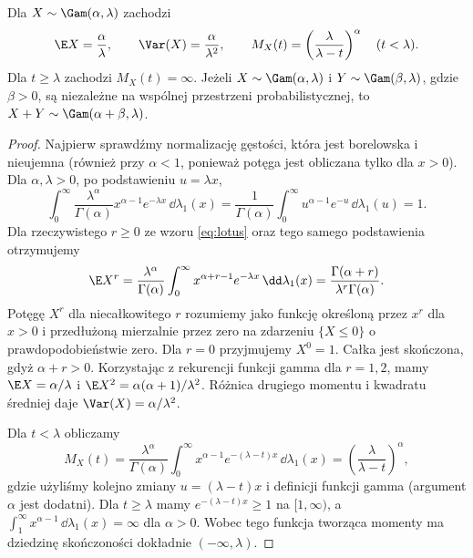 \begin{stwierdzenie}
Dla $X\sim\Gam(\alpha,\lambda)$ zachodzi
\[
\E X=\frac\alpha\lambda,\qquad
\Var(X)=\frac\alpha{\lambda^2},\qquad
M_X(t)=\left(\frac\lambda{\lambda-t}\right)^\alpha\quad(t<\lambda).
\]
Dla $t\geq\lambda$ zachodzi $M_X(t)=\infty$.
Jeżeli $X\sim\Gam(\alpha,\lambda)$ i
$Y\sim\Gam(\beta,\lambda)$, gdzie $\beta>0$, są niezależne
na wspólnej przestrzeni probabilistycznej, to
$X+Y\sim\Gam(\alpha+\beta,\lambda)$.
\end{stwierdzenie}
\begin{proof}
Najpierw sprawdźmy normalizację gęstości, która
jest borelowska i nieujemna (również przy $\alpha<1$,
ponieważ potęga jest obliczana tylko dla $x>0$).
Dla $\alpha,\lambda>0$, po podstawieniu $u=\lambda x$,
\[
\int_0^\infty\frac{\lambda^\alpha}{\Gamma(\alpha)}
 x^{\alpha-1}e^{-\lambda x}\,\dd\lambda_1(x)
=\frac1{\Gamma(\alpha)}\int_0^\infty
u^{\alpha-1}e^{-u}\,\dd\lambda_1(u)=1.
\]
Dla rzeczywistego $r\geq0$ ze wzoru \eqref{eq:lotus}
oraz tego samego podstawienia otrzymujemy
\[
\E X^r
=\frac{\lambda^\alpha}{\Gamma(\alpha)}
\int_0^\infty x^{\alpha+r-1}e^{-\lambda x}\,\dd\lambda_1(x)
=\frac{\Gamma(\alpha+r)}{\lambda^r\Gamma(\alpha)}.
\]
Potęgę $X^r$ dla niecałkowitego $r$ rozumiemy jako
funkcję określoną przez $x^r$ dla $x>0$ i przedłużoną
mierzalnie przez zero na zdarzeniu $\{X\leq0\}$
o prawdopodobieństwie zero. Dla $r=0$ przyjmujemy $X^0=1$.
Całka jest skończona, gdyż $\alpha+r>0$.
Korzystając z rekurencji funkcji gamma dla $r=1,2$,
mamy $\E X=\alpha/\lambda$ i
$\E X^2=\alpha(\alpha+1)/\lambda^2$.
Różnica drugiego momentu i kwadratu średniej daje
$\Var(X)=\alpha/\lambda^2$.

Dla $t<\lambda$ obliczamy
\[
M_X(t)=\frac{\lambda^\alpha}{\Gamma(\alpha)}
\int_0^\infty x^{\alpha-1}e^{-(\lambda-t)x}
\,\dd\lambda_1(x)
=\left(\frac{\lambda}{\lambda-t}\right)^\alpha,
\]
gdzie użyliśmy kolejno zmiany $u=(\lambda-t)x$
i definicji funkcji gamma (argument $\alpha$ jest dodatni).
Dla $t\geq\lambda$ mamy $e^{-(\lambda-t)x}\geq1$ na
$[1,\infty)$, a $\int_1^\infty x^{\alpha-1}\,\dd\lambda_1(x)
=\infty$ dla $\alpha>0$. Wobec tego funkcja tworząca
momenty ma dziedzinę skończoności dokładnie $(-\infty,\lambda)$.


\end{proof}
